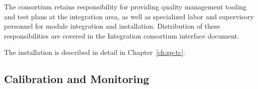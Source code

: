 


The  consortium retains responsibility for providing quality management tooling and test plans at the integration area, as well as specialized labor and supervisory personnel for  module integration and installation. Distribution of these responsibilities are covered in the Integration  consortium interface document.



The installation is described in detail in Chapter~\ref{ch:sp-tc}.




\subsection{Calibration and Monitoring}
\label{sec:fdsp-pd-intfc-calib}




